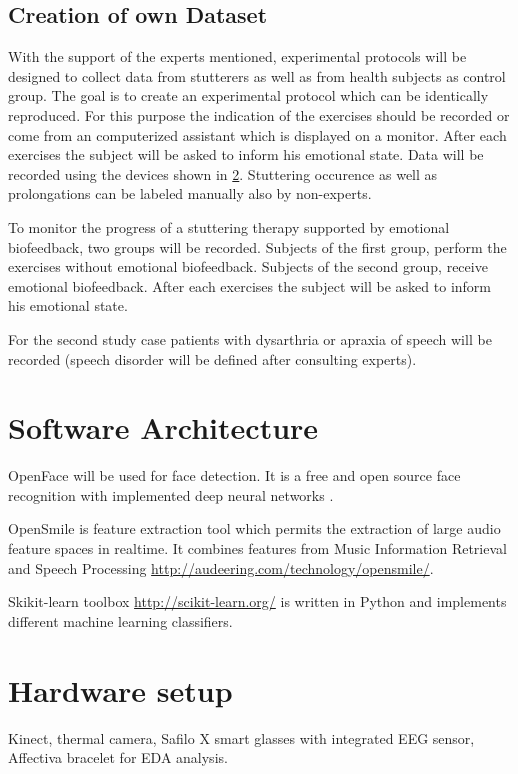 \subsection{Creation of own Dataset}

With the support of the experts mentioned, experimental protocols will be designed to collect data from stutterers as well as from health subjects as control group. The goal is to create an experimental protocol which can be identically reproduced. For this purpose the indication of the exercises should be recorded or come from an computerized assistant which is displayed on a monitor. After each exercises the subject will be asked to inform his emotional state. Data will 
be recorded using the devices shown in \ref{sec:hardware}. Stuttering occurence as well as prolongations can be labeled manually also by non-experts.

To monitor the progress of a stuttering therapy supported by emotional biofeedback, two groups will be recorded. Subjects of the first group, perform the exercises without emotional biofeedback. Subjects of the second group, receive emotional biofeedback. After each exercises the subject will be asked to inform his emotional state. 


For the second study case patients with dysarthria or apraxia of speech will be recorded (speech disorder will be defined after consulting experts).


\section{Software Architecture}
\label{sec:toolbox}

OpenFace will be used for face detection. It is a free and open source face recognition with implemented deep neural networks \cite{Amos2016openface}.

OpenSmile is feature extraction tool which permits the extraction of large audio feature spaces in realtime. It combines features from Music Information Retrieval and Speech Processing \url{http://audeering.com/technology/opensmile/}.

Skikit-learn toolbox \url{http://scikit-learn.org/} is written in Python and implements different machine learning classifiers.


\section{Hardware setup}
\label{sec:hardware}
Kinect, thermal camera, Safilo X smart glasses with integrated EEG sensor, Affectiva bracelet for EDA analysis. 

